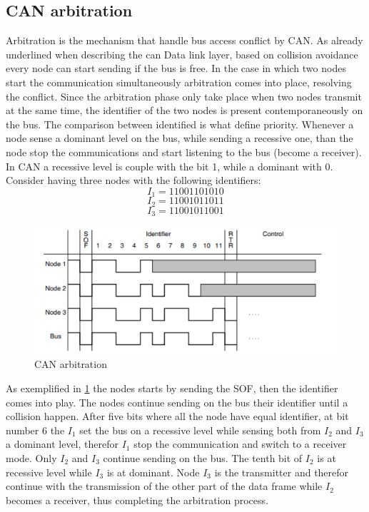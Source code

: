\documentclass[../main.tex]{subfiles}
\begin{document}
\subsection{CAN arbitration}
Arbitration is the mechanism that handle \gls{bus} access conflict by \gls{CAN}. As already underlined when describing the can Data link layer, based on collision avoidance every node can start sending if the \gls{bus} is free. In the case in which two nodes start the communication simultaneously arbitration comes into place, resolving the conflict. Since the arbitration phase only take place when two nodes transmit at the same time, the identifier of the two nodes is present contemporaneously on the \gls{bus}. The comparison between identified is what define priority. Whenever a node sense a dominant level on the \gls{bus}, while sending a recessive one, than the node stop the communications and start listening to the \gls{bus} (become a receiver). In \gls{CAN} a recessive level is couple with the bit 1, while a dominant with 0. Consider having three nodes with the following identifiers:
\begin{equation}
I_{1} = 11001101010
\end{equation}
\begin{equation}
I_{2} = 11001011011
\end{equation}
\begin{equation}
I_{3} = 11001011001
\end{equation}
\begin{figure}[ht]
    \centering
    \includegraphics[width=\linewidth]{images_folder/can_arbitration.png}
    \caption{CAN arbitration}
    \label{fig:CANABR}
\end{figure}
As exemplified in \ref{fig:CANABR} the nodes starts by sending the \gls{SOF}, then the identifier comes into play. The nodes continue sending on the \gls{bus} their identifier until a collision happen. After five bits where all the node have equal identifier, at bit number 6 the $I_1$ set the \gls{bus} on a recessive level while sensing both from $I_2$ and $I_3$ a dominant level, therefor $I_1$ stop the communication and switch to a receiver mode. Only $I_2$ and $I_3$ continue sending on the \gls{bus}. The tenth bit of $I_2$ is at recessive level while $I_3$ is at dominant. Node $I_3$ is the transmitter and therefor continue with the transmission of the other part of the data frame while $I_2$ becomes a receiver, thus completing the arbitration process.\\
\end{document}
